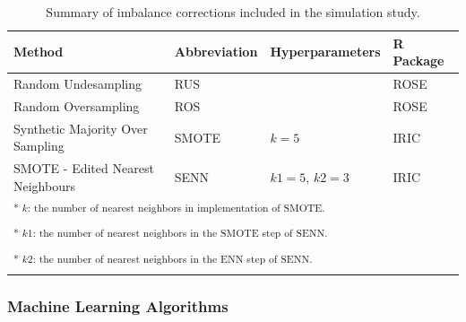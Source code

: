 \documentclass[AMA,STIX1COL,]{WileyNJD-v2}
\begin{document}
\begin{table}[!h]

\caption{\label{tab:corrections} Summary of imbalance corrections included in the simulation study.}
\centering
\begin{tabular}[t]{llll}
\toprule
Method & Abbreviation & Hyperparameters & R Package\\
\midrule
Random Undesampling & RUS &  & ROSE \cite{rose}\\
\addlinespace
Random Oversampling & ROS &  & ROSE \cite{rose}\\
\addlinespace
Synthetic Majority Over Sampling & SMOTE & $k=5$ & IRIC \cite{iric}\\
\addlinespace
SMOTE - Edited Nearest Neighbours & SENN & $k1=5$, $k2 = 3$ & IRIC \cite{iric}\\
\bottomrule
\multicolumn{4}{l}{\rule{0pt}{1em}\textsuperscript{*      $k$: the number of nearest neighbors in implementation of SMOTE.}}\\
\multicolumn{4}{l}{\rule{0pt}{1em}\textsuperscript{*    $k1$: the number of nearest neighbors in the SMOTE step of SENN.}}\\
\multicolumn{4}{l}{\rule{0pt}{1em}\textsuperscript{*     $k2$: the number of nearest neighbors in the ENN step of SENN.}}\\
\end{tabular}
\end{table}

\hypertarget{machine-learning-algorithms}{%
\subsubsection{Machine Learning
Algorithms}\label{machine-learning-algorithms}}
\end{document}
